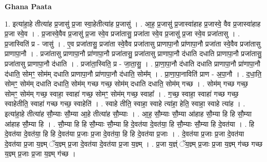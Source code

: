 \documentclass[17pt]{extarticle}
\begin{document}
\textbf{Ghana Paata } \newline

1. इत्या॑हा॒हे तीत्या॑ह प्र॒जासु॑ प्र॒जा स्वा॒हेतीत्या॑ह प्र॒जासु॑ । . आ॒ह॒ प्र॒जासु॑ प्र॒जास्वा॑हाह प्र॒जास्वे॒ वैव प्र॒जास्वा॑हाह प्र॒जा स्वे॒व । . प्र॒जास्वे॒वैव प्र॒जासु॑ प्र॒जा स्वे॒व प्रजा॑तासु॒ प्रजा॑ता स्वे॒व प्र॒जासु॑ प्र॒जा स्वे॒व प्रजा॑तासु । . प्र॒जास्विति॑ प्र - जासु॑ । . ए॒व प्रजा॑तासु॒ प्रजा॑ता स्वे॒वैव प्रजा॑तासु प्राणापा॒नौ प्रा॑णापा॒नौ प्रजा॑ता स्वे॒वैव प्रजा॑तासु प्राणापा॒नौ । . प्रजा॑तासु प्राणापा॒नौ प्रा॑णापा॒नौ प्रजा॑तासु॒ प्रजा॑तासु प्राणापा॒नौ द॑धाति दधाति प्राणापा॒नौ प्रजा॑तासु॒ प्रजा॑तासु प्राणापा॒नौ द॑धाति । . प्रजा॑ता॒स्विति॒ प्र - जा॒ता॒सु॒ । . प्रा॒णा॒पा॒नौ द॑धाति दधाति प्राणापा॒नौ प्रा॑णापा॒नौ द॑धाति॒ सोमꣳ॒॒ सोम॑म् दधाति प्राणापा॒नौ प्रा॑णापा॒नौ द॑धाति॒ सोम᳚म् । . प्रा॒णा॒पा॒नाविति॑ प्राण - अ॒पा॒नौ । . द॒धा॒ति॒ सोमꣳ॒॒ सोम॑म् दधाति दधाति॒ सोम॑म् गच्छ गच्छ॒ सोम॑म् दधाति दधाति॒ सोम॑म् गच्छ । . सोम॑म् गच्छ गच्छ॒ सोमꣳ॒॒ सोम॑म् गच्छ॒ स्वाहा॒ स्वाहा॑ गच्छ॒ सोमꣳ॒॒ सोम॑म् गच्छ॒ स्वाहा᳚ । . ग॒च्छ॒ स्वाहा॒ स्वाहा॑ गच्छ गच्छ॒ स्वाहेतीति॒ स्वाहा॑ गच्छ गच्छ॒ स्वाहेति॑ । . स्वाहे तीति॒ स्वाहा॒ स्वाहे त्या॑हा॒ हेति॒ स्वाहा॒ स्वाहे त्या॑ह । . इत्या॑हा॒हे तीत्या॑ह सौ॒म्याः सौ॒म्या आ॒हे तीत्या॑ह सौ॒म्याः । . आ॒ह॒ सौ॒म्याः सौ॒म्या आ॑हाह सौ॒म्या हि हि सौ॒म्या आ॑हाह सौ॒म्या हि । . सौ॒म्या हि हि सौ॒म्याः सौ॒म्या हि दे॒वत॑या दे॒वत॑या॒ हि सौ॒म्याः सौ॒म्या हि दे॒वत॑या । . हि दे॒वत॑या दे॒वत॑या॒ हि हि दे॒वत॑या प्र॒जाः प्र॒जा दे॒वत॑या॒ हि हि दे॒वत॑या प्र॒जाः । . दे॒वत॑या प्र॒जाः प्र॒जा दे॒वत॑या दे॒वत॑या प्र॒जा य॒ज्ञ्म् ॅय॒ज्ञ्म् प्र॒जा दे॒वत॑या दे॒वत॑या प्र॒जा य॒ज्ञ्म् । . प्र॒जा य॒ज्ञ्ं ॅय॒ज्ञ्म् प्र॒जाः प्र॒जा य॒ज्ञ्म् ग॑च्छ गच्छ य॒ज्ञ्म् प्र॒जाः प्र॒जा य॒ज्ञ्म् ग॑च्छ । \newline
\end{document}
